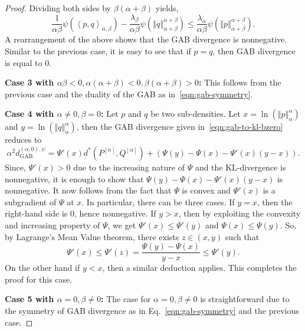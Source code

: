\documentclass[11pt]{article}
\theoremstyle{plain}
\theoremstyle{remark}
\newcommand{\dGAB}{d_{\mathrm{GAB}}}
\newcommand{\norm}[1]{\left\Vert #1 \right\Vert}
\newcommand{\inner}[1]{\left\langle #1\right\rangle}
\begin{document}
\begin{proof}
    \noindent Dividing both sides by $\beta(\alpha+\beta)$ yields,
    \begin{equation*}
        \dfrac{1}{\alpha\beta} \psi\left( \inner{p,q}_{\alpha,\beta} \right) - \dfrac{\lambda_\beta}{\alpha\beta}\psi\left( \norm{q}_{\alpha+\beta}^{\alpha+\beta} \right) \leq \dfrac{\lambda_\alpha}{\alpha\beta} \psi\left( \norm{p}_{\alpha+\beta}^{\alpha+\beta} \right).
    \end{equation*}
    \noindent A rearrangement of the above shows that the GAB divergence is nonnegative. Similar to the previous case, it is easy to see that if $p = q$, then GAB divergence is equal to $0$.

    \noindent\textbf{Case 3 with $\alpha\beta < 0, \alpha(\alpha+\beta) < 0, \beta(\alpha+\beta) > 0$:} This follows from the previous case and the duality of the GAB as in~\eqref{eqn:gab-symmetry}.

    \noindent\textbf{Case 4 with $\alpha \neq 0, \beta = 0$:} Let $p$ and $q$ be two sub-densities. Let $x = \ln(\norm{p}_{\alpha}^{\alpha})$ and $y = \ln(\norm{q}_{\alpha}^{\alpha})$, then the GAB divergence given in~\eqref{eqn:gab-to-kl-bzero} reduces to
    \begin{equation*}
        \alpha^2 \dGAB^{(\alpha,0),\psi}
        = \Psi'(x) d^\ast(P^{[\alpha]}, Q^{[\alpha]}) + \left( \Psi(y) - \Psi(x) - \Psi'(x)(y-x) \right).
    \end{equation*}
    \noindent Since, $\Psi'(x) > 0$ due to the increasing nature of $\Psi$ and the KL-divergence is nonnegative, it is enough to show that $\Psi(y)-\Psi(x)-\Psi'(x)(y-x)$ is nonnegative. It now follows from the fact that $\Psi$ is convex and $\Psi'(x)$ is a subgradient of $\Psi$ at $x$. In particular, there can be three cases. If $y = x$, then the right-hand side is $0$, hence nonnegative. If $y > x$, then by exploiting the convexity and increasing property of $\Psi$, we get $\Psi'(x)\le \Psi'(y)$ and $\Psi(x)\le \Psi(y)$. So, by Lagrange's Mean Value theorem, there exists $z\in (x,y)$ such that
    \begin{equation*}
        \Psi'(x) \leq \Psi'(z) = \frac{\Psi(y)-\Psi(x)}{y-x}\le \Psi'(y).
    \end{equation*}
    \noindent On the other hand if $y < x$, then a similar deduction applies. This completes the proof for this case.

    \noindent\textbf{Case 5 with $\alpha = 0, \beta \neq 0$:} The case for $\alpha = 0, \beta \neq 0$ is straightforward due to the symmetry of GAB divergence as in Eq.~\eqref{eqn:gab-symmetry} and the previous case.
\end{proof}
\end{document}

